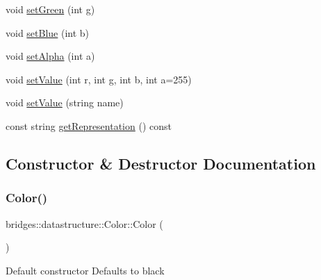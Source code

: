 \begin{DoxyCompactItemize}
\item 
void \mbox{\hyperlink{classbridges_1_1datastructure_1_1_color_ac1ac36232f13188eac0d7270a946261a}{set\+Green}} (int g)
\item 
void \mbox{\hyperlink{classbridges_1_1datastructure_1_1_color_a829b0b914125ee30ce3d3e45a52a45c1}{set\+Blue}} (int b)
\item 
void \mbox{\hyperlink{classbridges_1_1datastructure_1_1_color_a19ff34702143ec54248438dfad02e4a2}{set\+Alpha}} (int a)
\item 
void \mbox{\hyperlink{classbridges_1_1datastructure_1_1_color_aa23d4b981b994b4065f904195ffd8595}{set\+Value}} (int r, int g, int b, int a=255)
\item 
void \mbox{\hyperlink{classbridges_1_1datastructure_1_1_color_ad6c95830bb6d69d39624f3989127aa93}{set\+Value}} (string name)
\item 
const string \mbox{\hyperlink{classbridges_1_1datastructure_1_1_color_a2ebb4e803c935cf151e3309700f3978d}{get\+Representation}} () const
\end{DoxyCompactItemize}


\subsection{Constructor \& Destructor Documentation}
\mbox{\label{classbridges_1_1datastructure_1_1_color_ad6b8b6b89a54ebea80d211679e10be3e}} 
\subsubsection{\texorpdfstring{Color()}{Color()}\hspace{0.1cm}{\footnotesize\ttfamily [1/3]}}
{\footnotesize\ttfamily bridges\+::datastructure\+::\+Color\+::\+Color (\begin{DoxyParamCaption}{ }\end{DoxyParamCaption})\hspace{0.3cm}{\ttfamily [inline]}}

Default constructor Defaults to black \mbox{\label{classbridges_1_1datastructure_1_1_color_a0b746741c261fdc010adab62bbdb862c}} 
